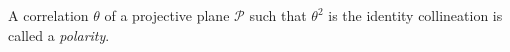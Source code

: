 A correlation $\theta$ of a projective plane $\mathcal{P}$ such that $\theta^2$ is the identity collineation is called a \emph{polarity}.
